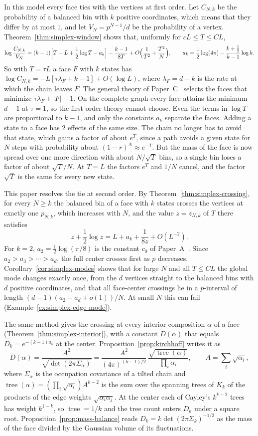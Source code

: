 \documentclass[11pt]{article}
\theoremstyle{definition}
\theoremstyle{remark}
\newcommand{\tree}{\operatorname{tree}}
\begin{document}
In this model every face ties with the vertices at first order. Let $C_{N,k}$
be the probability of a
balanced bin with $k$ positive coordinates, which means that they differ by at
most $1$, and let $V_N=p^{N-1}/d$ be the probability of a vertex.
Theorem~\ref{thm:simplex-window} shows that, uniformly for $cL\le T\le CL$,
\[
\log\frac{C_{N,k}}{V_N}=(k-1)\Bigl[T-L+\frac12\log T-a_k\Bigr]
-\frac{k-1}{8T}+O\Bigl(\frac1{T^2}+\frac{T^2}N\Bigr),\qquad
a_k=\frac12\log(4\pi)-\frac{k+\frac12}{k-1}\log k .
\]
So with $T=\tau L$ a face $F$ with $k$ states has
$\log C_{N,k}=-L[\tau\lambda_F+k-1]+O(\log L)$, where $\lambda_F=d-k$ is the
rate at which the chain leaves $F$. The general theory of Paper~C~\cite{paperC}
selects the faces that minimize $\tau\lambda_F+|F|-1$. On the complete graph
every face attains the minimum $d-1$ at $\tau=1$, so the first-order theory
cannot choose. Even the terms in $\log T$ are proportional to $k-1$, and only
the constants $a_k$ separate the faces. Adding a state to a face has 2 effects
of the same size. The chain no longer has to
avoid that state, which gains a factor of about $e^T$, since a path avoids a
given state for $N$ steps with probability about $(1-r)^N\approx e^{-T}$. But
the mass of the face is now spread over one more direction with about
$N/\sqrt T$ bins, so a single bin loses a factor of about $\sqrt T/N$. At
$T=L$ the factors $e^T$ and $1/N$ cancel, and the factor $\sqrt T$ is the same
for every new state.

This paper resolves the tie at second order. By
Theorem~\ref{thm:simplex-crossing}, for every $N\ge k$ the balanced bin of a
face with $k$ states crosses the vertices at exactly one $p_{N,k}$, which
increases with $N$, and the value $z=z_{N,k}$ of $T$ there satisfies
\[
z+\frac12\log z=L+a_k+\frac1{8z}+O(L^{-2}).
\]
For $k=2$, $a_2=\frac12\log(\pi/8)$ is the constant $c_0$ of
Paper~A~\cite{paperA}. Since $a_2>a_3>\cdots>a_d$, the full center crosses
first as $p$ decreases. Corollary~\ref{cor:simplex-modes} shows that for large
$N$ and all $T\le CL$ the global mode changes exactly once, from the $d$
vertices straight to the balanced bins with $d$ positive coordinates, and that
all face-center crossings lie in a $p$-interval of length
$(d-1)(a_2-a_d+o(1))/N$. At small $N$ this can fail
(Example~\ref{ex:simplex-edge-mode}).

The same method gives the crossing at every interior composition $\alpha$ of a
face (Theorem~\ref{thm:simplex-interior}), with a constant $D(\alpha)$ that
equals $D_k=e^{-(k-1)a_k}$ at the center. Proposition~\ref{prop:kirchhoff}
writes it as
\[
D(\alpha)=\frac{A^2}{\sqrt{\det(2\pi\Sigma_\alpha)}}
=\frac{A^2}{(4\pi)^{(k-1)/2}}\,\frac{\sqrt{\tree(\alpha)}}{\prod_i\alpha_i},
\qquad A=\sum_i\sqrt{\alpha_i},
\]
where $\Sigma_\alpha$ is the occupation covariance of a tilted chain and
$\tree(\alpha)=(\prod_i\sqrt{\alpha_i})A^{k-2}$ is the sum over the spanning
trees of $K_k$ of the products of the edge weights $\sqrt{\alpha_i\alpha_j}$.
At the center each of Cayley's $k^{k-2}$ trees has weight $k^{1-k}$, so
$\tree=1/k$ and the tree count enters $D_k$ under a square root.
Proposition~\ref{prop:mass-balance} reads $D_k=k\det(2\pi\Sigma_k)^{-1/2}$ as
the mass of the face divided by the Gaussian volume of its fluctuations.
\end{document}

